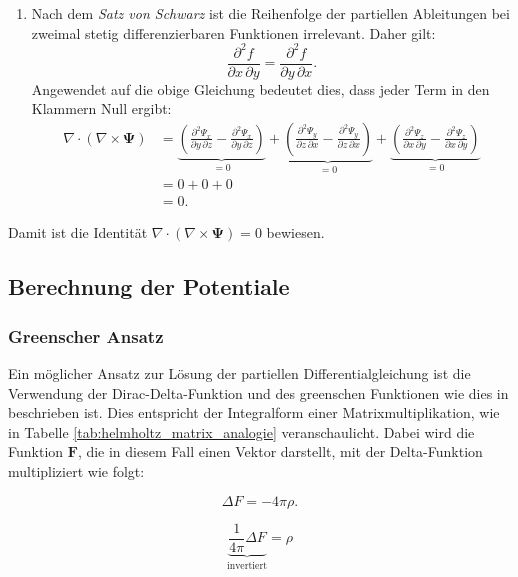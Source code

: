\begin{enumerate}
    \item Nach dem \emph{Satz von Schwarz} ist die Reihenfolge der partiellen Ableitungen bei zweimal stetig differenzierbaren Funktionen irrelevant. Daher gilt:
    \[
    \frac{\partial^2 f}{\partial x\, \partial y} = \frac{\partial^2 f}{\partial y\, \partial x}.
    \]
    Angewendet auf die obige Gleichung bedeutet dies, dass jeder Term in den Klammern Null ergibt:
    \begin{align*}
    \nabla \cdot (\nabla \times \boldsymbol{\Psi})
&=
\underbrace{\left( \frac{\partial^2 \Psi_x}{\partial y\, \partial z} - \frac{\partial^2 \Psi_x}{\partial y\, \partial z} \right)}_{\displaystyle=0}
+
\underbrace{\left( \frac{\partial^2 \Psi_y}{\partial z\, \partial x} - \frac{\partial^2 \Psi_y}{\partial z\, \partial x} \right)}_{\displaystyle=0}
+
\underbrace{\left( \frac{\partial^2 \Psi_z}{\partial x\, \partial y} - \frac{\partial^2 \Psi_z}{\partial x\, \partial y} \right)}_{\displaystyle=0} \\
    &= 0 + 0 + 0 \\
    &= 0.
    \end{align*}
\end{enumerate}
Damit ist die Identität $\nabla \cdot (\nabla \times \boldsymbol{\Psi}) = 0$ bewiesen.


\subsection{Berechnung der Potentiale
\label{helmholtz:subsection:Berechnung der Potentiale}}

\subsubsection{Greenscher Ansatz}
Ein möglicher Ansatz zur Lösung der partiellen Differentialgleichung
ist die Verwendung der Dirac-Delta-Funktion und des greenschen
Funktionen wie dies in \cite{baird_helmholtz} beschrieben ist.
Dies entspricht der Integralform einer Matrixmultiplikation, wie
in Tabelle \ref{tab:helmholtz_matrix_analogie} veranschaulicht.
Dabei wird die Funktion $\boldsymbol{F}$, die in diesem Fall einen
Vektor darstellt, mit der Delta-Funktion multipliziert wie folgt:

\begin{equation}
\Delta F = -4 \pi \rho. 
\label{helmholtz:DGL_idee}
\end{equation}

\begin{equation}
\underbrace{\frac{1}{4 \pi} \Delta F}_{\text{invertiert}} = \rho 
\label{helmholtz:DGL_idee_umformung}
\end{equation}

